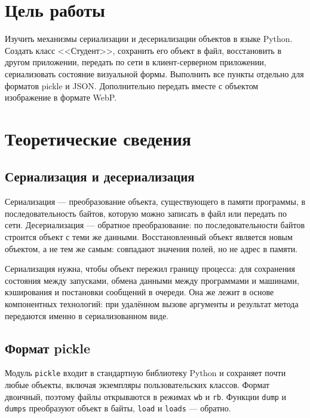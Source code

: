 \documentclass[14pt,a4paper]{extarticle}
\begin{document}

\tableofcontents

\section{Цель работы}

Изучить механизмы сериализации и десериализации объектов в языке Python. Создать класс
<<Студент>>, сохранить его объект в файл, восстановить в другом приложении, передать по
сети в клиент-серверном приложении, сериализовать состояние визуальной формы. Выполнить
все пункты отдельно для форматов pickle и JSON. Дополнительно передать вместе с объектом
изображение в формате WebP.

\section{Теоретические сведения}

\subsection{Сериализация и десериализация}

Сериализация --- преобразование объекта, существующего в памяти программы, в
последовательность байтов, которую можно записать в файл или передать по сети.
Десериализация --- обратное преобразование: по последовательности байтов строится
объект с теми же данными. Восстановленный объект является новым объектом, а не тем же
самым: совпадают значения полей, но не адрес в памяти.

Сериализация нужна, чтобы объект пережил границу процесса: для сохранения состояния
между запусками, обмена данными между программами и машинами, кэширования и постановки
сообщений в очереди. Она же лежит в основе компонентных технологий: при удалённом
вызове аргументы и результат метода передаются именно в сериализованном виде.

\subsection{Формат pickle}

Модуль \texttt{pickle} входит в стандартную библиотеку Python и сохраняет почти любые
объекты, включая экземпляры пользовательских классов. Формат двоичный, поэтому файлы
открываются в режимах \texttt{wb} и \texttt{rb}. Функции \texttt{dump} и
\texttt{dumps} преобразуют объект в байты, \texttt{load} и \texttt{loads} ---
обратно.
\end{document}
